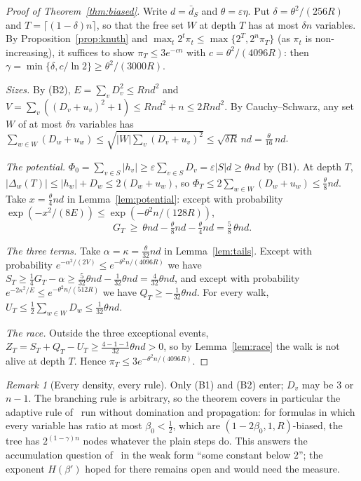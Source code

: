 \documentclass[11pt,a4paper]{article}
\theoremstyle{definition}
\theoremstyle{remark}
\newtheorem{remark}[theorem]{Remark}
\newcommand{\dS}{\bar d_S}
\begin{document}
\begin{proof}[Proof of Theorem~\ref{thm:biased}]
Write $d=\dS$ and $\theta=\varepsilon\eta$. Put $\delta=\theta^2/(256R)$ and
$T=\lceil(1-\delta)n\rceil$, so that the free set $W$ at depth $T$ has at most
$\delta n$ variables. By Proposition~\ref{prop:knuth} and
$\max_t2^t\pi_t\le\max\{2^T,2^n\pi_T\}$ (as $\pi_t$ is non-increasing), it
suffices to show $\pi_T\le3e^{-cn}$ with $c=\theta^2/(4096R)$: then
$\gamma=\min\{\delta,c/\ln2\}\ge\theta^2/(3000R)$.

\emph{Sizes.} By (B2), $E=\sum_vD_v^2\le Rnd^2$ and
$V=\sum_v((D_v+u_v)^2+1)\le Rnd^2+n\le2Rnd^2$. By Cauchy--Schwarz, any set
$W$ of at most $\delta n$ variables has
$\sum_{w\in W}(D_w+u_w)\le\sqrt{|W|\sum_v(D_v+u_v)^2}\le\sqrt{\delta R}\,nd
=\tfrac\theta{16}\,nd$.

\emph{The potential.} $\Phi_0=\sum_{v\in S}|h_v|\ge\varepsilon\sum_{v\in S}D_v
=\varepsilon|S|d\ge\theta nd$ by (B1). At depth $T$,
$|\Delta_w(T)|\le|h_w|+D_w\le2(D_w+u_w)$, so
$\Phi_T\le2\sum_{w\in W}(D_w+u_w)\le\tfrac\theta8nd$. Take $x=\tfrac\theta4nd$
in Lemma~\ref{lem:potential}: except with probability
$\exp(-x^2/(8E))\le\exp(-\theta^2n/(128R))$,
\[
 G_T\ \ge\ \theta nd-\tfrac\theta8nd-\tfrac\theta4nd=\tfrac58\,\theta nd .
\]

\emph{The three terms.} Take $\alpha=\kappa=\tfrac\theta{32}nd$ in
Lemma~\ref{lem:tails}. Except with probability
$e^{-\alpha^2/(2V)}\le e^{-\theta^2n/(4096R)}$ we have
$S_T\ge\frac14G_T-\alpha\ge\frac5{32}\theta nd-\frac1{32}\theta nd=\frac4{32}\theta nd$,
and except with probability $e^{-2\kappa^2/E}\le e^{-\theta^2n/(512R)}$ we
have $Q_T\ge-\frac1{32}\theta nd$. For every walk,
$U_T\le\frac12\sum_{w\in W}D_w\le\frac1{32}\theta nd$.

\emph{The race.} Outside the three exceptional events,
$Z_T=S_T+Q_T-U_T\ge\frac{4-1-1}{32}\theta nd>0$, so by Lemma~\ref{lem:race} the
walk is not alive at depth $T$. Hence $\pi_T\le3e^{-\theta^2n/(4096R)}$.
\end{proof}

\begin{remark}[Every density, every rule]
Only (B1) and (B2) enter; $D_v$ may be $3$ or $n-1$. The branching rule is
arbitrary, so the theorem covers in particular the adaptive rule
of~\cite[Section~6]{N4} run without domination and propagation: for formulas
in which every variable has ratio at most $\beta_0<\frac12$, which are
$(1-2\beta_0,1,R)$-biased, the tree has $2^{(1-\gamma)n}$ nodes whatever the
plain steps do. This answers the accumulation question
of~\cite[Problem~17, open question~1]{N4} in the weak form ``some constant
below $2$''; the exponent $H(\beta')$ hoped for there remains open and would
need the measure.
\end{remark}
\end{document}
